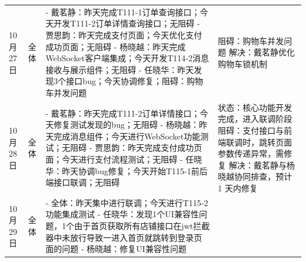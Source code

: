 \begin{levellist}
\begin{longtable}{>{\centering\arraybackslash}m{1cm} >{\centering\arraybackslash}m{1cm} >{\centering\arraybackslash}m{8.5cm} >{\centering\arraybackslash}m{3cm}}
        10月27日                                              & 全体                                                                               & - 戴茗静：昨天完成T111-1订单查询接口；今天开发T111-2订单详情查询接口；无阻碍 \newline
        - 贾思韵：昨天完成支付页面；今天优化支付成功页面；无阻碍 \newline
        - 杨晓越：昨天完成WebSocket客户端集成；今天开发T114-2消息接收与展示组件；无阻碍 \newline
        - 任晓华：昨天发现3个接口bug；今天协调修复；阻碍：购物车并发问题                 & 阻碍：购物车并发问题 \newline
        解决：戴茗静优化购物车锁机制                                                                                                                                                                                                                                   \\
        10月28日                                              & 全体                                                                               & - 戴茗静：昨天完成T111-2订单详情接口；今天修复测试发现的bug；无阻碍 \newline
        - 杨晓越：昨天完成消息组件；今天进行WebSocket功能测试；无阻碍 \newline
        - 贾思韵：昨天完成支付成功页面；今天进行支付流程测试；无阻碍 \newline
        - 任晓华：昨天协调bug修复；今天开始T115-1前后端接口联调；无阻碍               & 状态：核心功能开发完成，进入联调阶段  \newline
        阻碍：支付接口与前端联调时，跳转页面参数传递异常，需修复  \newline
        解决：戴茗静与杨晓越协同排查，预计 1 天内修复                                                                                                                                                                                                                         \\
        10月29日                                              & 全体                                                                               & - 全体：昨天集中进行联调；今天进行T115-2功能集成测试 \newline
        - 任晓华：发现1个UI兼容性问题，1个由于首页获取所有店铺接口在jwt拦截器中未放行导致一进入首页就跳转到登录页面的问题 \newline
        - 杨晓越：修复UI兼容性问题 \newline

\end{longtable}
\end{levellist}
